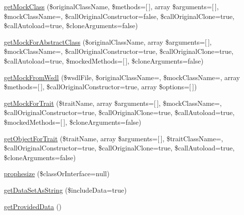 \begin{DoxyCompactItemize}
\mbox{\hyperlink{class_p_h_p_unit___framework___test_case_a0b3ef9c03e9d69dcec2a86964b8fd46c}{get\+Mock\+Class}} (\$original\+Class\+Name, \$methods=\mbox{[}$\,$\mbox{]}, array \$arguments=\mbox{[}$\,$\mbox{]}, \$mock\+Class\+Name=\textquotesingle{}\textquotesingle{}, \$call\+Original\+Constructor=false, \$call\+Original\+Clone=true, \$call\+Autoload=true, \$clone\+Arguments=false)
\item 
\mbox{\hyperlink{class_p_h_p_unit___framework___test_case_a93b72d6cee274c3899efba7dabfed0d8}{get\+Mock\+For\+Abstract\+Class}} (\$original\+Class\+Name, array \$arguments=\mbox{[}$\,$\mbox{]}, \$mock\+Class\+Name=\textquotesingle{}\textquotesingle{}, \$call\+Original\+Constructor=true, \$call\+Original\+Clone=true, \$call\+Autoload=true, \$mocked\+Methods=\mbox{[}$\,$\mbox{]}, \$clone\+Arguments=false)
\item 
\mbox{\hyperlink{class_p_h_p_unit___framework___test_case_a2e103f3c8271bf3a1dca6b95a38cad5d}{get\+Mock\+From\+Wsdl}} (\$wsdl\+File, \$original\+Class\+Name=\textquotesingle{}\textquotesingle{}, \$mock\+Class\+Name=\textquotesingle{}\textquotesingle{}, array \$methods=\mbox{[}$\,$\mbox{]}, \$call\+Original\+Constructor=true, array \$options=\mbox{[}$\,$\mbox{]})
\item 
\mbox{\hyperlink{class_p_h_p_unit___framework___test_case_a94b9ad81d2b6d9cefac1ac44e6388e1d}{get\+Mock\+For\+Trait}} (\$trait\+Name, array \$arguments=\mbox{[}$\,$\mbox{]}, \$mock\+Class\+Name=\textquotesingle{}\textquotesingle{}, \$call\+Original\+Constructor=true, \$call\+Original\+Clone=true, \$call\+Autoload=true, \$mocked\+Methods=\mbox{[}$\,$\mbox{]}, \$clone\+Arguments=false)
\item 
\mbox{\hyperlink{class_p_h_p_unit___framework___test_case_aa2d60c8f9532c9b08124447f734caeea}{get\+Object\+For\+Trait}} (\$trait\+Name, array \$arguments=\mbox{[}$\,$\mbox{]}, \$trait\+Class\+Name=\textquotesingle{}\textquotesingle{}, \$call\+Original\+Constructor=true, \$call\+Original\+Clone=true, \$call\+Autoload=true, \$clone\+Arguments=false)
\item 
\mbox{\hyperlink{class_p_h_p_unit___framework___test_case_aee3901b35180731fb3b3bc51de4d894b}{prophesize}} (\$class\+Or\+Interface=null)
\item 
\mbox{\hyperlink{class_p_h_p_unit___framework___test_case_a2989a7710c6f5dfcbd67844d9f3d0041}{get\+Data\+Set\+As\+String}} (\$include\+Data=true)
\item 
\mbox{\hyperlink{class_p_h_p_unit___framework___test_case_adf2b2e56e6ff447b969361259f8d34b5}{get\+Provided\+Data}} ()

\end{DoxyCompactItemize}
